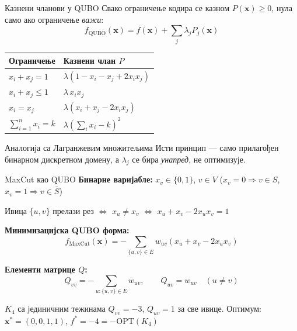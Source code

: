\documentclass[aspectratio=169]{beamer}
\begin{document}
\begin{frame}{Казнени чланови у QUBO}
  Свако ограничење кодира се казном $P(\mathbf{x}) \geq 0$,
  нула само ако ограничење \emph{важи}:
  \[
    f_{\mathrm{QUBO}}(\mathbf{x}) = f(\mathbf{x}) + \sum_j \lambda_j P_j(\mathbf{x})
  \]

  \medskip
  \begin{table}
    \renewcommand{\arraystretch}{1.35}
    \small
    \begin{tabular}{|l|l|}
      \hline
      \textbf{Ограничење} & \textbf{Казнени члан $P$} \\
      \hline
      $x_i + x_j = 1$ & $\lambda(1 - x_i - x_j + 2x_ix_j)$ \\
      $x_i + x_j \leq 1$ & $\lambda\, x_i x_j$ \\
      $x_i = x_j$ & $\lambda(x_i + x_j - 2x_ix_j)$ \\
      $\sum_{i=1}^n x_i = k$ & $\lambda\!\left(\sum_i x_i - k\right)^2$ \\
      \hline
    \end{tabular}
  \end{table}

  \begin{block}{Аналогија са Лагранжевим множитељима}
    Исти принцип — само прилагођен бинарном дискретном домену,
    а $\lambda_j$ се бира \emph{унапред}, не оптимизује.
  \end{block}
\end{frame}

\begin{frame}{MaxCut као QUBO}
  \textbf{Бинарне варијабле:} $x_v \in \{0,1\}$, $v\in V$
  \quad ($x_v=0 \Rightarrow v\in S$, $x_v=1 \Rightarrow v\in\bar S$)

  \medskip
  Ивица $\{u,v\}$ прелази рез $\iff$ $x_u \neq x_v$
  $\iff$ $x_u + x_v - 2x_ux_v = 1$

  \medskip
  \textbf{Минимизацијска QUBO форма:}
  \[
    \boxed{
      f_{\mathrm{MaxCut}}(\mathbf{x})
      = -\!\sum_{\{u,v\}\in E} w_{uv}(x_u + x_v - 2x_ux_v)
    }
  \]

  \textbf{Елементи матрице $Q$:}
  \[
    Q_{vv} = -\!\sum_{u:\{u,v\}\in E} w_{uv}, \qquad
    Q_{uv} = w_{uv} \quad (u\neq v)
  \]

  \begin{exampleblock}{$K_4$ са јединичним тежинама}
    $Q_{vv} = -3$, $Q_{uv} = 1$ за све ивице.
    Оптимум: $\mathbf{x}^* = (0,0,1,1)$, $f^* = -4 = -\mathrm{OPT}(K_4)$
  \end{exampleblock}
\end{frame}
\end{document}
